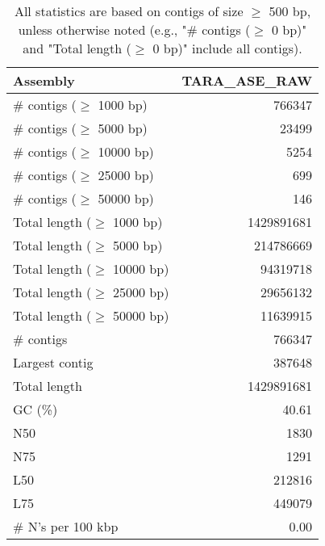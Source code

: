 \documentclass[12pt,a4paper]{article}
\begin{document}
\begin{table}[ht]
\begin{center}
\caption{All statistics are based on contigs of size $\geq$ 500 bp, unless otherwise noted (e.g., "\# contigs ($\geq$ 0 bp)" and "Total length ($\geq$ 0 bp)" include all contigs).}
\begin{tabular}{|l*{1}{|r}|}
\hline
Assembly & TARA\_ASE\_RAW \\ \hline
\# contigs ($\geq$ 1000 bp) & 766347 \\ \hline
\# contigs ($\geq$ 5000 bp) & 23499 \\ \hline
\# contigs ($\geq$ 10000 bp) & 5254 \\ \hline
\# contigs ($\geq$ 25000 bp) & 699 \\ \hline
\# contigs ($\geq$ 50000 bp) & 146 \\ \hline
Total length ($\geq$ 1000 bp) & 1429891681 \\ \hline
Total length ($\geq$ 5000 bp) & 214786669 \\ \hline
Total length ($\geq$ 10000 bp) & 94319718 \\ \hline
Total length ($\geq$ 25000 bp) & 29656132 \\ \hline
Total length ($\geq$ 50000 bp) & 11639915 \\ \hline
\# contigs & 766347 \\ \hline
Largest contig & 387648 \\ \hline
Total length & 1429891681 \\ \hline
GC (\%) & 40.61 \\ \hline
N50 & 1830 \\ \hline
N75 & 1291 \\ \hline
L50 & 212816 \\ \hline
L75 & 449079 \\ \hline
\# N's per 100 kbp & 0.00 \\ \hline
\end{tabular}
\end{center}
\end{table}
\end{document}
